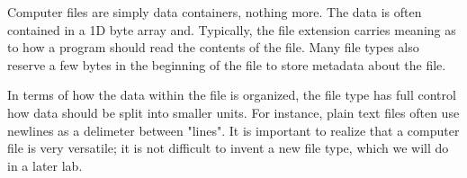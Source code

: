 Computer files are simply data containers, nothing more. The data is often contained in a 1D byte array and. Typically, the file extension carries meaning as to how a program should read the contents of the file. Many file types also reserve a few bytes in the beginning of the file to store metadata about the file.

In terms of how the data within the file is organized, the file type has full control how data should be split into smaller units. For instance, plain text files often use newlines as a delimeter between "lines". It is important to realize that a computer file is very versatile; it is not difficult to invent a new file type, which we will do in a later lab. 
